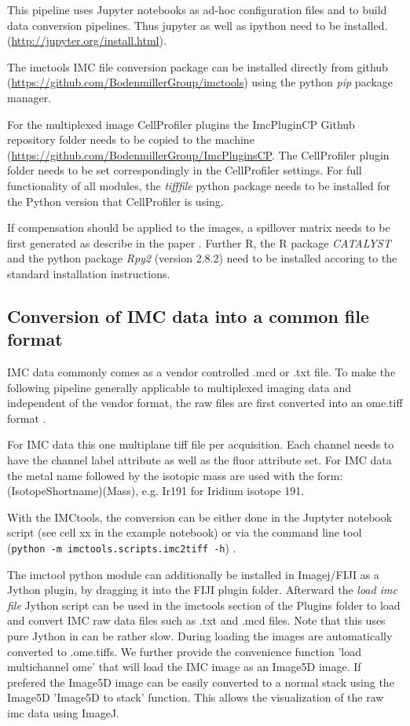 \documentclass[a4paper]{article}
\begin{document}
This pipeline uses Jupyter notebooks as ad-hoc configuration files and to build data conversion
pipelines. Thus jupyter as well as ipython need to be installed.
(\url{http://jupyter.org/install.html}).
 
The imctools IMC file conversion package can be installed directly from github
(\url{https://github.com/BodenmillerGroup/imctools}) using the python \textit{pip} package manager.

For the multiplexed image CellProfiler plugins the  ImcPluginCP Github repository folder needs to
be copied to the machine (\url{https://github.com/BodenmillerGroup/ImcPluginsCP}. The CellProfiler plugin folder needs to be set correspondingly in the
CellProfiler settings. For full functionality of all modules, the \textit{tifffile} python package needs
to be installed for the Python version that CellProfiler is using. 

If compensation should be applied to the images, a spillover matrix needs to be first generated as describe in
the paper \cite{stephane_chevrier_channel_2017}. Further R, the R package \textit{CATALYST} and the
python package \textit{Rpy2}
(version 2.8.2) need
to be installed accoring to the standard installation instructions.

\subsection{Conversion of IMC data into a common file format}
IMC data commonly comes as a vendor controlled .mcd or .txt file. To make the following pipeline
generally applicable to multiplexed imaging data and independent of the vendor format, the raw
files are first converted into an ome.tiff format \cite{goldberg_open_2005}.

For IMC data this one multiplane tiff file per acquisition. Each channel needs to have the channel
label attribute as well as the fluor attribute set. For IMC data the metal name followed by the
isotopic mass are used with the form: (IsotopeShortname)(Mass), e.g. Ir191 for Iridium isotope 191.

With the IMCtools, the conversion can be either done in the Juptyter notebook script (see cell xx in the example
notebook) or via the command line tool (\texttt{python -m
imctools.scripts.imc2tiff -h}) .

The imctool  python module can additionally be installed in Imagej/FIJI \cite{schneider_nih_2012} as a Jython plugin, by
dragging it into the FIJI plugin folder. Afterward the \textit{load imc file} Jython script can be used in
the imctools section of the Plugins folder to load and convert IMC raw data files such as .txt and
.mcd files. Note that this uses pure Jython in can be rather slow. During loading the images are
automatically converted to .ome.tiffs. We further provide the convenience function 'load
multichannel ome' that will load the IMC image as an Image5D image. If prefered the Image5D image
can be easily converted to a normal stack using the Image5D 'Image5D to stack' function. This
allows the visualization of the raw imc data using ImageJ.
\end{document}
